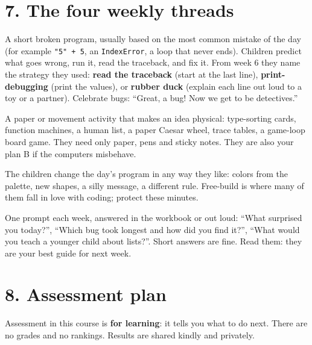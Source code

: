 \documentclass[level=2,teacher]{kidscode}
\begin{document}
\section{7. The four weekly threads}
\begin{bughunt}
A short broken program, usually based on the most common mistake of the day (for example
\texttt{"5" + 5}, an \texttt{IndexError}, a loop that never ends). Children predict what goes
wrong, run it, read the traceback, and fix it. From week 6 they name the strategy they used:
\textbf{read the traceback} (start at the last line), \textbf{print-debugging} (print the values),
or \textbf{rubber duck} (explain each line out loud to a toy or a partner).
Celebrate bugs: \enquote{Great, a bug! Now we get to be detectives.}
\end{bughunt}

\begin{unplugged}
A paper or movement activity that makes an idea physical: type-sorting cards, function machines,
a human list, a paper Caesar wheel, trace tables, a game-loop board game. They need only paper,
pens and sticky notes. They are also your plan B if the computers misbehave.
\end{unplugged}

\begin{freebuild}
The children change the day's program in any way they like: colors from the palette, new
shapes, a silly message, a different rule. Free-build is where many of them fall in love with
coding; protect these minutes.
\end{freebuild}

\begin{reflection}[Wrap-up]
One prompt each week, answered in the workbook or out loud: \enquote{What surprised you today?},
\enquote{Which bug took longest and how did you find it?}, \enquote{What would you teach a younger
child about lists?}. Short answers are fine. Read them: they are your best guide for next week.
\end{reflection}

\section{8. Assessment plan}
Assessment in this course is \textbf{for learning}: it tells you what to do next. There are no
grades and no rankings. Results are shared kindly and privately.
\end{document}
